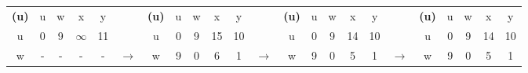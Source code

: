 \documentclass{article}
\begin{document}
\subsection{}
\begin{latin}
\begin{table}[H]
\begin{tabular}{ccccccccccccccccccccccc}
\cline{1-5} \cline{7-11} \cline{13-17} \cline{19-23}
\multicolumn{1}{|c|}{\textbf{(u)}} & \multicolumn{1}{c|}{u} & \multicolumn{1}{c|}{w} & \multicolumn{1}{c|}{x} & \multicolumn{1}{c|}{y} & \multicolumn{1}{c|}{}                  & \multicolumn{1}{c|}{\textbf{(u)}} & \multicolumn{1}{c|}{u} & \multicolumn{1}{c|}{w} & \multicolumn{1}{c|}{x} & \multicolumn{1}{c|}{y} & \multicolumn{1}{c|}{}                  & \multicolumn{1}{c|}{\textbf{(u)}} & \multicolumn{1}{c|}{u} & \multicolumn{1}{c|}{w} & \multicolumn{1}{c|}{x} & \multicolumn{1}{c|}{y} & \multicolumn{1}{c|}{}                  & \multicolumn{1}{c|}{\textbf{(u)}} & \multicolumn{1}{c|}{u} & \multicolumn{1}{c|}{w} & \multicolumn{1}{c|}{x} & \multicolumn{1}{c|}{y} \\ \cline{1-5} \cline{7-11} \cline{13-17} \cline{19-23} 
\multicolumn{1}{|c|}{u}            & 0                      & 9                      & $\infty$               & 11                     & \multicolumn{1}{c|}{}                  & \multicolumn{1}{c|}{u}            & 0                      & 9                      & 15                     & 10                     & \multicolumn{1}{c|}{}                  & \multicolumn{1}{c|}{u}            & 0                      & 9                      & 14                     & 10                     & \multicolumn{1}{c|}{}                  & \multicolumn{1}{c|}{u}            & 0                      & 9                      & 14                     & 10                     \\ \cline{1-1} \cline{7-7} \cline{13-13} \cline{19-19}
\multicolumn{1}{|c|}{w}            & -                      & -                      & -                      & -                      & \multicolumn{1}{c|}{$\longrightarrow$} & \multicolumn{1}{c|}{w}            & 9                      & 0                      & 6                      & 1                      & \multicolumn{1}{c|}{$\longrightarrow$} & \multicolumn{1}{c|}{w}            & 9                      & 0                      & 5                      & 1                      & \multicolumn{1}{c|}{$\longrightarrow$} & \multicolumn{1}{c|}{w}            & 9                      & 0                      & 5                      & 1                      \\ \cline{1-1} \cline{7-7} \cline{13-13} \cline{19-19}

\end{tabular}
\end{table}
\end{latin}
\end{document}
